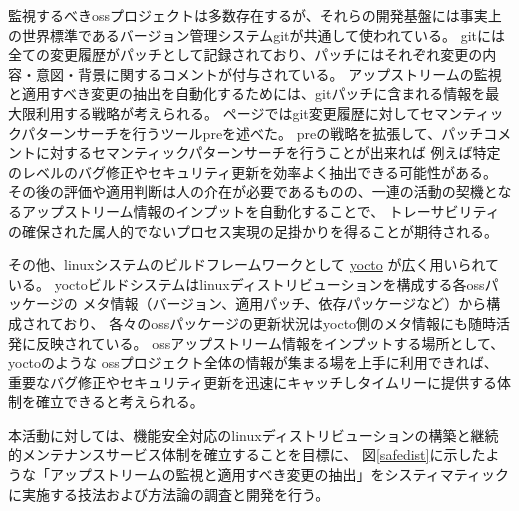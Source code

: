 \par
監視するべき\acrshort{oss}プロジェクトは多数存在するが、それらの開発基盤には事実上の世界標準であるバージョン管理システム\acrshort{git}が共通して使われている。
\acrshort{git}には全ての変更履歴がパッチとして記録されており、パッチにはそれぞれ変更の内容・意図・背景に関するコメントが付与されている。
アップストリームの監視と適用すべき変更の抽出を自動化するためには、\acrshort{git}パッチに含まれる情報を最大限利用する戦略が考えられる。
\pageref{presec}ページでは\acrshort{git}変更履歴に対してセマンティックパターンサーチを行うツール\acrshort{pre}を述べた。
\acrshort{pre}の戦略を拡張して、パッチコメントに対するセマンティックパターンサーチを行うことが出来れば
例えば特定のレベルのバグ修正やセキュリティ更新を効率よく抽出できる可能性がある。
その後の評価や適用判断は人の介在が必要であるものの、一連の活動の契機となるアップストリーム情報のインプットを自動化することで、
トレーサビリティの確保された属人的でないプロセス実現の足掛かりを得ることが期待される。
\par
その他、\acrshort{linux}システムのビルドフレームワークとして
\href{https://git.yoctoproject.org/cgit/cgit.cgi/}{\acrshort{yocto}} \cite{yocto}
が広く用いられている。
\acrshort{yocto}ビルドシステムは\acrshort{linux}ディストリビューションを構成する各\acrshort{oss}パッケージの
メタ情報（バージョン、適用パッチ、依存パッケージなど）から構成されており、
各々の\acrshort{oss}パッケージの更新状況は\acrshort{yocto}側のメタ情報にも随時活発に反映されている。
\acrshort{oss}アップストリーム情報をインプットする場所として、\acrshort{yocto}のような
\acrshort{oss}プロジェクト全体の情報が集まる場を上手に利用できれば、
重要なバグ修正やセキュリティ更新を迅速にキャッチしタイムリーに提供する体制を確立できると考えられる。
\par
本活動に対しては、機能安全対応の\acrshort{linux}ディストリビューションの構築と継続的メンテナンスサービス体制を確立することを目標に、
図\ref{safedist}に示したような「アップストリームの監視と適用すべき変更の抽出」をシスティマティックに実施する技法および方法論の調査と開発を行う。
